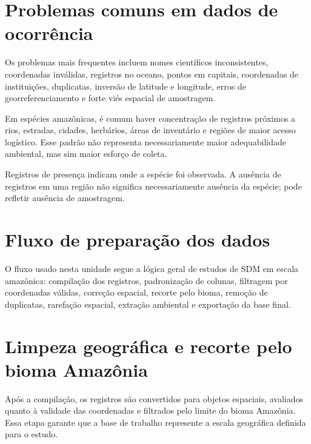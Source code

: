 \documentclass{ueap-sdm}
\begin{document}
\section{Problemas comuns em dados de ocorrência}

Os problemas mais frequentes incluem nomes científicos inconsistentes, coordenadas inválidas, registros no oceano, pontos em capitais, coordenadas de instituições, duplicatas, inversão de latitude e longitude, erros de georreferenciamento e forte viés espacial de amostragem.

Em espécies amazônicas, é comum haver concentração de registros próximos a rios, estradas, cidades, herbários, áreas de inventário e regiões de maior acesso logístico. Esse padrão não representa necessariamente maior adequabilidade ambiental, mas sim maior esforço de coleta.

\begin{atencao}[title={\faExclamationTriangle\quad Ocorrência não é ausência}]
	Registros de presença indicam onde a espécie foi observada. A ausência de registros em uma região não significa necessariamente ausência da espécie; pode refletir ausência de amostragem.
\end{atencao}

\section{Fluxo de preparação dos dados}

O fluxo usado nesta unidade segue a lógica geral de estudos de SDM em escala amazônica: compilação dos registros, padronização de colunas, filtragem por coordenadas válidas, correção espacial, recorte pelo bioma, remoção de duplicatas, rarefação espacial, extração ambiental e exportação da base final.


\section{Limpeza geográfica e recorte pelo bioma Amazônia}

Após a compilação, os registros são convertidos para objetos espaciais, avaliados quanto à validade das coordenadas e filtrados pelo limite do bioma Amazônia. Essa etapa garante que a base de trabalho represente a escala geográfica definida para o estudo.

\end{document}
